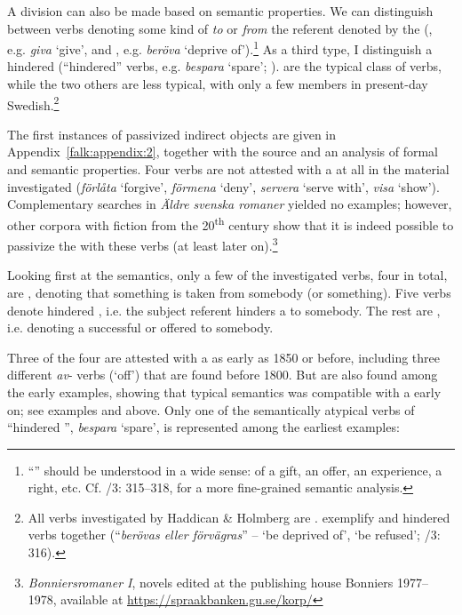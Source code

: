 \documentclass[output=paper]{langscibook}
\begin{document}
A division can also be made based on semantic properties. We can distinguish between  verbs denoting some kind of  \textit{to} or  \textit{from} the referent denoted by the  (, e.g. \textit{giva} ‘give’, and , e.g. \textit{beröva} ‘deprive of’).\footnote{“” should be understood in a wide sense:  of a gift, an offer, an experience, a right, etc. Cf. \citealt{TelemanEtAl1999}/3: 315–318, \citet{Valdeson2021} for a more fine-grained semantic analysis.} As a third type, I distinguish a hindered  (“hindered” verbs, e.g. \textit{bespara} ‘spare’; \citealt{Valdeson2021}).  are the typical class of  verbs, while the two others are less typical, with only a few members in present-day Swedish.\footnote{All verbs investigated by Haddican \& Holmberg are . \citet{TelemanEtAl1999} exemplify  and hindered  verbs together (“\textit{berövas eller förvägras}” – ‘be deprived of’, ‘be refused’; \citealt{TelemanEtAl1999}/3: 316).} 



The first instances of passivized indirect objects are given in Appendix~\ref{falk:appendix:2}, together with the source and an analysis of formal and semantic properties. Four verbs are not attested with a  at all in the material investigated (\textit{förlåta} ‘forgive’, \textit{förmena} ‘deny’, \textit{servera} ‘serve with’, \textit{visa} ‘show’). Complementary searches in \textit{Äldre} \textit{svenska romaner} yielded no examples; however, other corpora with fiction from the 20\textsuperscript{th} century show that it is indeed possible to passivize the  with these verbs (at least later on).\footnote{\textit{Bonniersromaner I}, novels edited at the publishing house Bonniers 1977–1978, available at \url{https://spraakbanken.gu.se/korp/}} 



Looking first at the semantics, only a few of the investigated verbs, four in total, are , denoting that something is taken from somebody (or something). Five verbs denote hindered , i.e. the subject referent hinders a  to somebody. The rest are , i.e. denoting a successful or offered  to somebody. 



Three of the four  are attested with a  as early as 1850 or before, including three different \textit{av}{}- verbs (‘off’) that are found before 1800. But  are also found among the early examples, showing that typical  semantics was compatible with a  early on; see examples  and  above. Only one of the semantically atypical verbs of “hindered ”, \textit{bespara} ‘spare’, is represented among the earliest examples:
\end{document}
